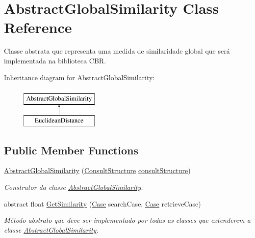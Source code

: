 \hypertarget{class_abstract_global_similarity}{}\section{Abstract\+Global\+Similarity Class Reference}
\label{class_abstract_global_similarity}


Classe abstrata que representa uma medida de similaridade global que será implementada na biblioteca C\+BR.  


Inheritance diagram for Abstract\+Global\+Similarity\+:\begin{figure}[H]
\begin{center}
\leavevmode
\includegraphics[height=2.000000cm]{class_abstract_global_similarity}
\end{center}
\end{figure}
\subsection*{Public Member Functions}
\begin{DoxyCompactItemize}
\item 
\hyperlink{class_abstract_global_similarity_ac13f827a8680ef4b6ee0d40911969f16}{Abstract\+Global\+Similarity} (\hyperlink{class_consult_structure}{Consult\+Structure} \hyperlink{class_abstract_global_similarity_a471ea41af416fd702d48f3b143416e66}{consult\+Structure})
\begin{DoxyCompactList}\small\item\em Construtor da classe \hyperlink{class_abstract_global_similarity}{Abstract\+Global\+Similarity}. \end{DoxyCompactList}\item 
abstract float \hyperlink{class_abstract_global_similarity_a4b97677ae2f5a0bdee41019b40b45114}{Get\+Similarity} (\hyperlink{class_case}{Case} search\+Case, \hyperlink{class_case}{Case} retrieve\+Case)
\begin{DoxyCompactList}\small\item\em Método abstrato que deve ser implementado por todas as classes que extenderem a classe \hyperlink{class_abstract_global_similarity}{Abstract\+Global\+Similarity}. \end{DoxyCompactList}\end{DoxyCompactItemize}
